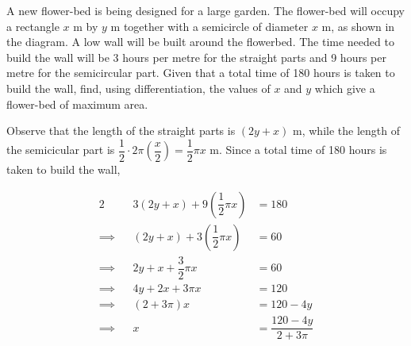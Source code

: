 \documentclass{echw}
\begin{document}

    \problem{}
        \begin{center}
        \end{center}
        
        \noindent A new flower-bed is being designed for a large garden. The flower-bed will occupy a rectangle $x$ m by $y$ m together with a semicircle of diameter $x$ m, as shown in the diagram. A low wall will be built around the flowerbed. The time needed to build the wall will be 3 hours per metre for the straight parts and 9 hours per metre for the semicircular part. Given that a total time of 180 hours is taken to build the wall, find, using differentiation, the values of $x$ and $y$ which give a flower-bed of maximum area.

    \solution
        Observe that the length of the straight parts is $(2y + x)$ m, while the length of the semicicular part is $\dfrac12 \cdot 2\pi\left(\dfrac{x}2\right) = \dfrac12 \pi x$ m. Since a total time of 180 hours is taken to build the wall,

        \begin{alignat*}{2}
            &&3 (2y + x) + 9\left(\dfrac12 \pi x\right) &= 180\\
            \implies&& (2y + x) + 3\left(\dfrac12 \pi x\right) &= 60\\
            \implies&&2y + x + \dfrac32 \pi x &= 60\\
            \implies&&4y + 2x + 3\pi x &= 120\\
            \implies&&(2 + 3\pi)x &= 120-4y\\
            \implies&& x &= \dfrac{120-4y}{2+3\pi}
        \end{alignat*}
\end{document}
